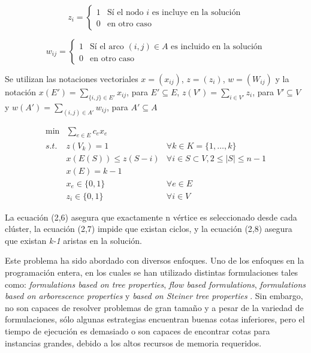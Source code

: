 $$
z_i =
\left\{
\begin{array}{cl}
	1	& \mbox {Sí el nodo } i \mbox{ es incluye en la solución}\\
	0	& \mbox{en otro caso}
\end{array}
\right.
$$

$$
w_{ij} =
\left\{
\begin{array}{cl}
	1	& \mbox {Sí el arco } (i, j) \in A \mbox{ es incluido en la solución}\\
	0	& \mbox{en otro caso}
\end{array}
\right.
$$
\vfill

Se utilizan las notaciones vectoriales $ x = (x_{ij})$, $z = (z_i)$, $w = (W_{ij})$ y la notación $x(E') = \sum_{\{i, j\} \in E'} x_{ij}$, para $E' \subseteq E$, $z(V') = \sum_{i \in V'}z_i$, para $V' \subseteq V$ y $w(A') = \sum_{(i, j) \in A'} w_{ij}$, para $A' \subseteq A$
\vfill



\begin{eqnarray}
	\min	& \sum_{e \in E} c_e x_e&\\
	s.t.	& z(V_k) = 1			& \forall k \in K=\{1, \hdots, k\}\\
			& x(E(S)) \leq z(S - i)	& \forall i \in S \subset V, 2 \leq |S| \leq n - 1\\
			& x(E) = k - 1			& \\
			& x_e \in \{0, 1\}		& \forall e \in E\\
			& z_i \in \{0, 1\}		& \forall i \in V\
\end{eqnarray}



La ecuación (2,6) asegura que exactamente n vértice es seleccionado desde cada clúster, la ecuación (2,7) impide que existan ciclos, y la ecuación (2,8) asegura que existan \textit{k-1} aristas en la solución.


Este problema ha sido abordado con diversos enfoques. Uno de los enfoques en la programación entera, en los cuales se han utilizado distintas formulaciones tales como: \textit{formulations based on tree properties},\textit{ flow based formulations}, \textit{formulations based on arborescence properties} y \textit{based on Steiner tree properties} \citep{pop2009survey}. Sin embargo, no son capaces de resolver problemas de gran tamaño y a pesar de la variedad de formulaciones, sólo algunas estrategias encuentran buenas cotas inferiores, pero el tiempo de ejecución es demasiado \citep{ferreira2012grasp} o son capaces de encontrar cotas para instancias grandes, debido a los altos recursos de memoria requeridos.



